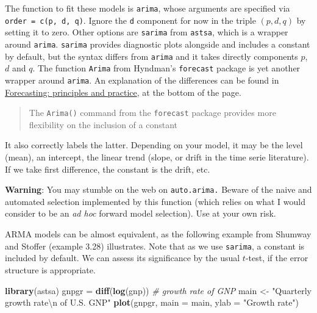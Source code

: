 \documentclass[]{book}
\newenvironment{Shaded}{\begin{snugshade}}{\end{snugshade}}
\newcommand{\KeywordTok}[1]{\textcolor[rgb]{0.13,0.29,0.53}{\textbf{#1}}}
\newcommand{\DataTypeTok}[1]{\textcolor[rgb]{0.13,0.29,0.53}{#1}}
\newcommand{\CharTok}[1]{\textcolor[rgb]{0.31,0.60,0.02}{#1}}
\newcommand{\StringTok}[1]{\textcolor[rgb]{0.31,0.60,0.02}{#1}}
\newcommand{\CommentTok}[1]{\textcolor[rgb]{0.56,0.35,0.01}{\textit{#1}}}
\newcommand{\NormalTok}[1]{#1}
\begin{document}
The function to fit these models is \texttt{arima}, whose arguments are
specified via \texttt{order\ =\ c(p,\ d,\ q)}. Ignore the \texttt{d}
component for now in the triple \((p, d, q)\) by setting it to zero.
Other options are \texttt{sarima} from \texttt{astsa}, which is a
wrapper around \texttt{arima}. \texttt{sarima} provides diagnostic plots
alongside and includes a constant by default, but the syntax differs
from \texttt{arima} and it takes directly components \(p\), \(d\) and
\(q\). The function \texttt{Arima} from Hyndman's \texttt{forecast}
package is yet another wrapper around \texttt{arima}. An explanation of
the differences can be found in
\href{https://www.otexts.org/fpp/8/7}{Forecasting: principles and
practice}, at the bottom of the page.

\begin{quote}
The \texttt{Arima()} command from the \texttt{forecast} package provides
more flexibility on the inclusion of a constant
\end{quote}

It also correctly labels the latter. Depending on your model, it may be
the level (mean), an intercept, the linear trend (slope, or drift in the
time serie literature). If we take first difference, the constant is the
drift, etc.

\textbf{Warning}: You may stumble on the web on \texttt{auto.arima.}
Beware of the naive and automated selection implemented by this function
(which relies on what I would consider to be an \emph{ad hoc} forward
model selection). Use at your own risk.

ARMA models can be almost equivalent, as the following example from
Shumway and Stoffer (example 3.28) illustrates. Note that as we use
\texttt{sarima}, a constant is included by default. We can assess its
significance by the usual \(t\)-test, if the error structure is
appropriate.

\begin{Shaded}
\begin{Highlighting}[]
\KeywordTok{library}\NormalTok{(astsa)}
\NormalTok{gnpgr =}\StringTok{ }\KeywordTok{diff}\NormalTok{(}\KeywordTok{log}\NormalTok{(gnp))  }\CommentTok{# growth rate of GNP}
\NormalTok{main <-}\StringTok{ "Quarterly growth rate}\CharTok{\textbackslash{}n}\StringTok{ of U.S. GNP"}
\KeywordTok{plot}\NormalTok{(gnpgr, }\DataTypeTok{main =}\NormalTok{ main, }\DataTypeTok{ylab =} \StringTok{"Growth rate"}\NormalTok{)}
\end{Highlighting}
\end{Shaded}
\end{document}
